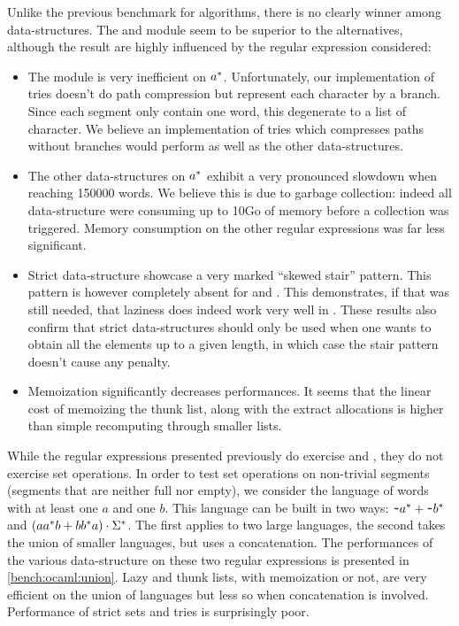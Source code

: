 Unlike the previous benchmark for algorithms, there is no clearly winner
among data-structures. The  and  module seem to
be superior to the alternatives, although the result are highly influenced by
the regular expression considered:
\begin{itemize}[leftmargin=*]
\item The  module is very inefficient on $a^*$. Unfortunately,
  our implementation of tries doesn't do path compression but represent
  each character by a branch. Since each segment only contain
  one word, this degenerate to a list of character. We believe
  an implementation of tries which compresses paths without branches
  would perform as well as the other data-structures.
\item The other data-structures on $a^*$ exhibit a very pronounced slowdown
  when reaching 150000 words.
  We believe this is due to garbage collection: indeed
  all data-structure were consuming up to 10Go of memory before
  a collection was triggered. Memory consumption on the other regular
  expressions was far less significant.
\item Strict data-structure showcase a very marked ``skewed stair'' pattern.
  This pattern is however completely absent for  and
  . This demonstrates, if that was still needed,
  that laziness does indeed work very well in \ocaml. These results also confirm
  that strict data-structures should only be used when one wants to obtain
  all the elements up to a given length, in which case the stair pattern
  doesn't cause any penalty.
\item Memoization significantly decreases performances. It seems
  that the linear cost of memoizing the thunk list, along with
  the extract allocations is higher than simple recomputing through smaller
  lists.
\end{itemize}

While the regular expressions presented previously do exercise
 and , they do not exercise set operations.
In order to test set operations on non-trivial segments (segments that
are neither full nor empty), we consider the language of words with at least
one $a$ and one $b$. This language can be built in two ways:
$\texttt{\textasciitilde}{a^*} +{\texttt{\textasciitilde}{b^*}}$ and
$(aa^*b +{bb^*a}) \cdot{\Sigma^*}$.
The first applies  to two large languages, the second takes
the union of smaller languages, but uses a concatenation.
The performances of the various data-structure on these two regular expressions
is presented in \cref{bench:ocaml:union}.
Lazy and thunk lists, with memoization or not, are very efficient on the union of languages but less so when concatenation is involved. Performance of strict sets and tries is surprisingly poor.

